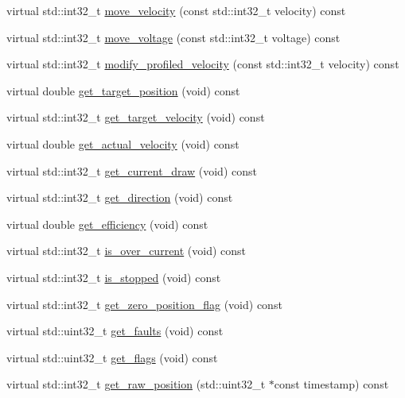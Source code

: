 \begin{DoxyCompactItemize}
\item 
virtual std\+::int32\+\_\+t \hyperlink{classpros_1_1Motor_a797de937c2d550c3fa199806db07dbcc}{move\+\_\+velocity} (const std\+::int32\+\_\+t velocity) const
\item 
virtual std\+::int32\+\_\+t \hyperlink{classpros_1_1Motor_a3c79db57c20617fbbc49461c58612cfb}{move\+\_\+voltage} (const std\+::int32\+\_\+t voltage) const
\item 
virtual std\+::int32\+\_\+t \hyperlink{classpros_1_1Motor_a44f39232cec1caee6d668d8ff21dc28b}{modify\+\_\+profiled\+\_\+velocity} (const std\+::int32\+\_\+t velocity) const
\item 
virtual double \hyperlink{classpros_1_1Motor_a7ad83a73bf15b94aaad8d10970bb254c}{get\+\_\+target\+\_\+position} (void) const
\item 
virtual std\+::int32\+\_\+t \hyperlink{classpros_1_1Motor_a8b8148a179cfadd579c8d4c82eb5873f}{get\+\_\+target\+\_\+velocity} (void) const
\item 
virtual double \hyperlink{classpros_1_1Motor_a696494a4e7c675f7007d41b947f9ea63}{get\+\_\+actual\+\_\+velocity} (void) const
\item 
virtual std\+::int32\+\_\+t \hyperlink{classpros_1_1Motor_a502eaf3859452721e2327e53ab3f34d8}{get\+\_\+current\+\_\+draw} (void) const
\item 
virtual std\+::int32\+\_\+t \hyperlink{classpros_1_1Motor_acea42a96da651f72f138ea268c76217f}{get\+\_\+direction} (void) const
\item 
virtual double \hyperlink{classpros_1_1Motor_a6f0b39894abf612a1965a66224893c71}{get\+\_\+efficiency} (void) const
\item 
virtual std\+::int32\+\_\+t \hyperlink{classpros_1_1Motor_a2d34c92effccfbb4d2f45319bf4bd272}{is\+\_\+over\+\_\+current} (void) const
\item 
virtual std\+::int32\+\_\+t \hyperlink{classpros_1_1Motor_a884c19ae71a6c9f0b316520f09769be9}{is\+\_\+stopped} (void) const
\item 
virtual std\+::int32\+\_\+t \hyperlink{classpros_1_1Motor_a589a3cbb397ba065c30c1f16bb3f08a7}{get\+\_\+zero\+\_\+position\+\_\+flag} (void) const
\item 
virtual std\+::uint32\+\_\+t \hyperlink{classpros_1_1Motor_a66c6f6420485059af301a9c8a99b2045}{get\+\_\+faults} (void) const
\item 
virtual std\+::uint32\+\_\+t \hyperlink{classpros_1_1Motor_a7e24aa1c4363a131829e902f12e7364c}{get\+\_\+flags} (void) const
\item 
virtual std\+::int32\+\_\+t \hyperlink{classpros_1_1Motor_ae82c57d590e18d7d90afec1e9cc3bb4e}{get\+\_\+raw\+\_\+position} (std\+::uint32\+\_\+t $\ast$const timestamp) const

\end{DoxyCompactItemize}
